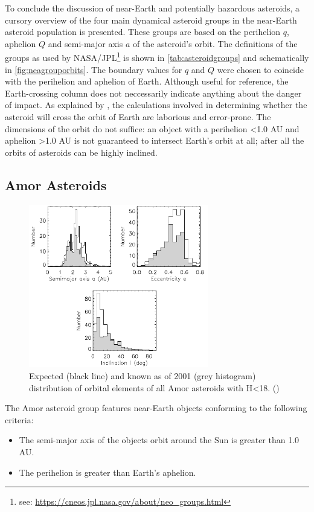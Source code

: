 To conclude the discussion of near-Earth and potentially hazardous asteroids, a cursory overview of the four main dynamical asteroid groups in the near-Earth asteroid population is presented. These groups are based on the perihelion $q$, aphelion $Q$ and semi-major axis $a$ of the asteroid's orbit. The definitions of the groups as used by NASA/JPL\footnote{see: \url{https://cneos.jpl.nasa.gov/about/neo_groups.html}} is shown in \autoref{tab:asteroidgroups} and schematically in \autoref{fig:neagrouporbits}. The boundary values for $q$ and $Q$ were chosen to coincide with the perihelion and aphelion of Earth. Although useful for reference, the Earth-crossing column does not neccessarily indicate anything about the danger of impact. As explained by \cite{dontdoECA}, the calculations involved in determining whether the asteroid will cross the orbit of Earth are laborious and error-prone. The dimensions of the orbit do not suffice: an object with a perihelion <1.0 AU and aphelion >1.0 AU is not guaranteed to intersect Earth's orbit at all; after all the orbits of asteroids can be highly inclined. \\


\newpage
\subsection{Amor Asteroids}
\begin{figure}[htb]
    \centering
    \includegraphics[width=0.7\textwidth]{images/amordist.png}
    \caption{Expected (black line) and known as of 2001 (grey histogram) distribution of orbital elements of all Amor asteroids with H<18. (\cite{debiased})}
    \label{fig:amordistribution}
\end{figure}
The Amor asteroid group features near-Earth objects conforming to the following criteria:
\begin{itemize}
    \item The semi-major axis of the objects orbit around the Sun is greater than 1.0 AU. 
    \item The perihelion is greater than Earth's aphelion.
\end{itemize}

